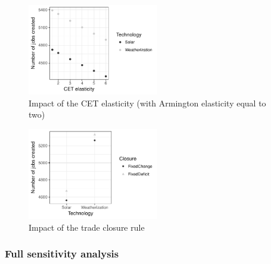 \begin{figure}[!ht]
	\centering
	\includegraphics[height=4cm]{figures/CET.pdf}
	\caption{Impact of the CET elasticity (with Armington elasticity equal to two)}
	\label{fig:cet}
\end{figure}

\begin{figure}[!ht]
	\centering
	\includegraphics[height=4cm]{figures/closure.pdf}
	\caption{Impact of the trade closure rule}
	\label{fig:closure}
\end{figure}

\subsubsection{Full sensitivity analysis}
\label{sec:full_sensitivity}

